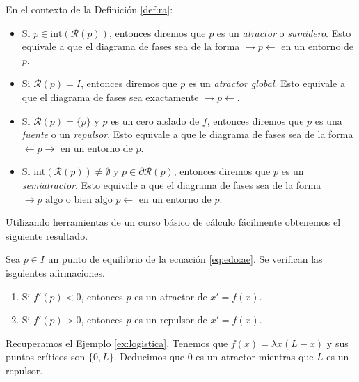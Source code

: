 \documentclass{article}
\begin{document}
\begin{definition}
  \label{def:atractor}
  En el contexto de la Definición \ref{def:ra}:
  \begin{itemize}
  \item Si $p \in \mathrm{int}(\mathcal{R}(p))$, entonces diremos que $p$ es un \emph{atractor} o
    \emph{sumidero}. Esto equivale a que el diagrama de fases sea de la forma
    $\rightarrow p \leftarrow$ en un entorno de $p$.
  \item Si $\mathcal{R}(p) = I$, entonces diremos que $p$ es un \emph{atractor global}. Esto
    equivale a que el diagrama de fases sea exactamente $\rightarrow p \leftarrow$.
  \item Si $\mathcal{R}(p) = \{p\}$ y $p$ es un cero aislado de $f$, entonces diremos que $p$ es una
    \emph{fuente} o un \emph{repulsor}. Esto equivale a que le diagrama de fases sea de la forma
    $\leftarrow p \rightarrow$ en un entorno de $p$.
  \item Si $\mathrm{int}(\mathcal{R}(p)) \ne \emptyset$ y $p \in \partial \mathcal{R}(p)$, entonces
    diremos que $p$ es un \emph{semiatractor}. Esto equivale a que el diagrama de fases sea de la
    forma $\rightarrow p \text{ algo}$ o bien $\text{algo } p \leftarrow$ en un entorno de $p$.
  \end{itemize}
\end{definition}

Utilizando herramientas de un curso básico de cálculo fácilmente obtenemos el siguiente resultado.

\begin{prop}
  Sea $p \in I$ un punto de equilibrio de la ecuación \eqref{eq:edo:ae}. Se verifican las isguientes
  afirmaciones.
  \begin{enumerate}
  \item Si $f'(p) < 0$, entonces $p$ es un atractor de $x' = f(x)$.
  \item Si $f'(p) > 0$, entonces $p$ es un repulsor de $x' = f(x)$.
  \end{enumerate}
\end{prop}

\begin{ex}
  Recuperamos el Ejemplo \ref{ex:logistica}. Tenemos que $f(x) = \lambda x(L-x)$ y sus puntos críticos son $\{0, L\}$. Deducimos que $0$ es un atractor mientras que $L$ es un repulsor.
\end{ex}

\newpage
\end{document}
